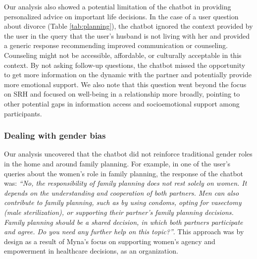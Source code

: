 Our analysis also showed a potential limitation of the chatbot in providing personalized advice on important life decisions. In the case of a user question about divorce (Table \ref{tab:planning}), the chatbot ignored the context provided by the user in the query that the user's husband is not living with her and provided a generic response recommending improved communication or counseling. Counseling might not be accessible, affordable, or culturally acceptable in this context.
By not asking follow-up questions, the chatbot missed the opportunity to get more information on the dynamic with the partner and potentially provide more emotional support. 
We also note that this question went beyond the focus on SRH and focused on well-being in a relationship more broadly, pointing to other potential gaps in information access and socioemotional support among participants.
\subsubsection{Dealing with gender bias} 
Our analysis uncovered that the chatbot did not reinforce traditional gender roles in the home and around family planning.
For example, in one of the user's queries about the women's role in family planning, the response of the chatbot was: \textit{``No, the responsibility of family planning does not rest solely on women. It depends on the understanding and cooperation of both partners. Men can also contribute to family planning, such as by using
condoms, opting for vasectomy (male sterilization), or supporting their partner’s family planning
decisions. Family planning should be a shared decision, in which both partners participate and agree.
Do you need any further help on this topic?''}. 
This approach was by design as a result of Myna's focus on supporting women's agency and empowerment in healthcare decisions, as an organization. 

